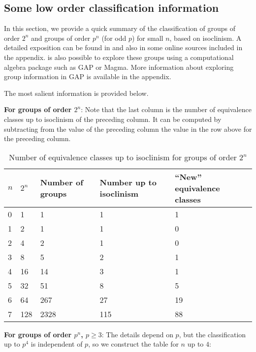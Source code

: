 \subsection{Some low order classification information}

In this section, we provide a quick summary of the classification of
groups of order $2^n$ and groups of order $p^n$ (for odd $p$) for
small $n$, based on isoclinism. A detailed exposition can be found in
\cite{HallSenior} and also in some online sources included in the
appendix. is also possible to explore these groups using a
computational algebra package such as GAP or Magma. More information
about exploring group information in GAP is available in the appendix.

The most salient information is provided below.

{\bf For groups of order $2^n$}: Note that the last column is the
number of equivalence classes up to isoclinism of the preceding
column. It can be computed by subtracting from the value of the
preceding column the value in the row above for the preceding column.

\begin{small}
\begin{table}[htbp]
\caption{Number of equivalence classes up to isoclinism for groups of
  order $2^n$}\label{T2}
\begin{tabular}{|l|l|l|l|l|}
  \hline
  $n$ & $2^n$ & Number of groups & Number up to isoclinism & ``New'' equivalence classes\\
  \hline
  0 & 1 & 1 & 1 & 1\\\hline
  1 & 2 & 1 & 1 & 0\\\hline
  2 & 4 & 2 & 1 & 0\\\hline
  3 & 8 & 5 & 2 & 1\\\hline
  4 &16 &14 & 3 & 1\\\hline
  5 &32 &51 & 8 & 5\\\hline
  6 &64&267 & 27& 19\\\hline
  7&128&2328&115& 88\\\hline
\end{tabular}
\end{table}
\end{small}
{\bf For groups of order $p^n$, $p \ge 3$}: The details depend on $p$,
but the classification up to $p^4$ is independent of $p$, so we
construct the table for $n$ up to $4$:

